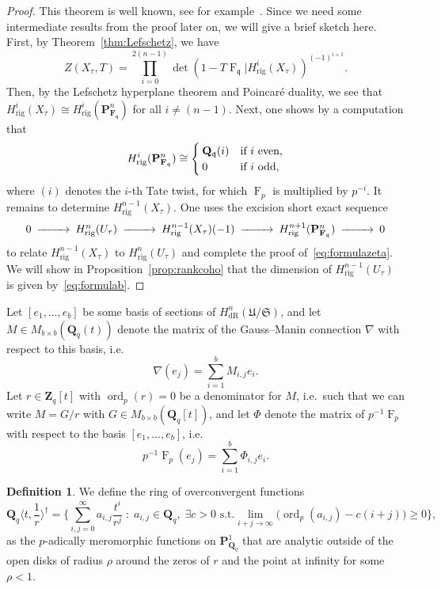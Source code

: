 \documentclass[a4paper,11pt]{article}
\numberwithin{equation}{section}
\newcommand{\ZZ}{\mathbf{Z}} %
\newcommand{\QQ}{\mathbf{Q}} %
\newcommand{\FF}{\mathbf{F}} %
\DeclareMathOperator{\ord}{ord}          %
\DeclareMathOperator{\Frob}{F}           %
\providecommand{\HdR}{H_{\text{dR}}}    %
\providecommand{\Hrig}{H_{\text{rig}}}  %
\theoremstyle{definition}
\newtheorem{defn}[thm]{Definition}
\begin{document}
\begin{proof}
This theorem is well known, see for example~\citep{AbbottKedlayaRoe2006}. 
Since we need some intermediate results from the proof later on, we will 
give a brief sketch here. First, by Theorem~\ref{thm:Lefschetz}, we have 
\[
Z(X_{\tau},T) = \prod_{i=0}^{2(n-1)} \det(1- T \Frob_{\mathfrak{q}} | \Hrig^i(X_{\tau}))^{(-1)^{i+1}}.
\]
Then, by the Lefschetz hyperplane theorem and Poincar\'e duality, we see 
that $\Hrig^i(X_{\tau}) \cong \Hrig^i(\mathbf{P}^n_{\FF_{\mathfrak{q}}})$ 
for all $i \neq (n-1)$. Next, one shows by a computation that
\begin{equation} \label{eqn:projcoho}
\Hrig^i(\mathbf{P}^n_{\FF_{\mathfrak{q}}}) 
\cong 
\begin{cases}
\QQ_{\mathfrak{q}}(i) &\mbox{if $i$ even,} \\
$0$ &\mbox{if $i$ odd,} 
\end{cases} 
\end{equation}
where $(i)$ denotes the $i$-th Tate twist, for which $\Frob_p$ is multiplied 
by $p^{-i}$. It remains to determine $\Hrig^{n-1}(X_{\tau})$. One uses the 
excision short exact sequence
\begin{equation} \label{eqn:excision}
\begin{CD}
0 @>>> \Hrig^{n}(U_{\tau}) @>>> \Hrig^{n-1}(X_{\tau})(-1) @>>> \Hrig^{n+1}(\mathbf{P}^n_{\FF_{\mathfrak{q}}}) @>>> 0
\end{CD} 
\end{equation}
to relate $\Hrig^{n-1}(X_{\tau})$ to $\Hrig^{n}(U_{\tau})$ and complete 
the proof of~\eqref{eq:formulazeta}. We will show in Proposition~\ref{prop:rankcoho}
that the dimension of $\Hrig^{n-1}(U_{\tau})$ is given by~\eqref{eq:formulab}.
\end{proof}

Let $[e_1, \dotsc, e_b]$ be some basis of sections of 
$\HdR^n(\mathfrak{U}/\mathfrak{S})$, and let $M \in M_{b \times b}(\QQ_q(t))$ 
denote the matrix of the Gauss--Manin connection $\nabla$ with respect 
to this basis, i.e.
\[
\nabla (e_j) = \sum_{i=1}^b M_{i,j} e_i.
\]
Let $r \in \ZZ_q[t]$ with $\ord_p(r)=0$ be a denominator for $M$, i.e.\ such that we can write 
$M = G/r$ with $G \in M_{b \times b}(\QQ_q[t])$, and let $\Phi$ denote the 
matrix of $p^{-1}\Frob_p$ with respect to the basis $[e_1, \dotsc, e_b]$, i.e.\
\[
p^{-1} \Frob_p (e_j) = \sum_{i=1}^b \Phi_{i,j} e_i.
\]

\begin{defn}
We define the ring of overconvergent functions
\[
\QQ_q \langle t, \frac{1}{r} \rangle^{\dag} = 
\biggl\{\sum_{i,j=0}^{\infty} a_{i,j} \frac{t^i}{r^j} \; : \; 
a_{i,j} \in \QQ_q, \; \exists c > 0 \text{ s.t.}  
\lim_{i+j \rightarrow \infty} \bigl(\ord_p(a_{i,j}) - c(i+j)\bigr) \geq 0
\biggr\},
\]
as the $p$-adically meromorphic functions on $\mathbf{P}^1_{\QQ_q}$ that are 
analytic outside of the open disks of radius $\rho$ around the zeros of $r$ 
and the point at infinity for some $\rho<1$. 
\end{defn}
\end{document}
